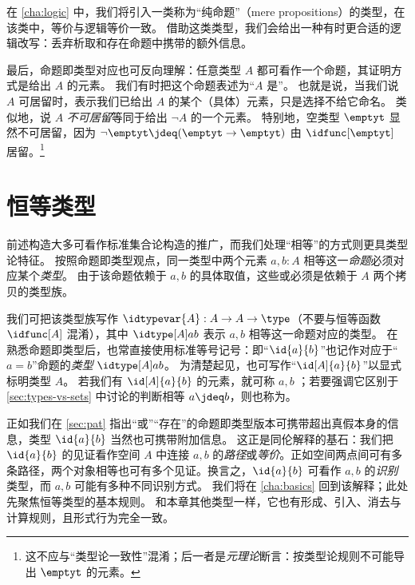 在 \cref{cha:logic} 中，我们将引入一类称为“纯命题”（mere propositions）的类型，在该类中，等价与逻辑等价一致。
借助这类类型，我们会给出一种有时更合适的逻辑改写：丢弃析取和存在命题中携带的额外信息。

最后，命题即类型对应也可反向理解：任意类型 $A$ 都可看作一个命题，其证明方式是给出 $A$ 的元素。
我们有时把这个命题表述为“$A$ 是”。
%
%
也就是说，当我们说 $A$ 可居留时，表示我们已给出 $A$ 的某个（具体）元素，只是选择不给它命名。
类似地，说 $A$ \emph{不可居留}等同于给出 $\neg A$ 的一个元素。
特别地，空类型 $\emptyt$ 显然不可居留，因为 $\neg \emptyt \jdeq (\emptyt \to \emptyt)$ 由 $\idfunc[\emptyt]$ 居留。\footnote{这不应与“类型论一致性”混淆；后一者是\emph{元理论}断言：按类型论规则不可能导出 $\emptyt$ 的元素。}

%
%
%

\section{恒等类型}
\label{sec:identity-types}

%
%
%
%
前述构造大多可看作标准集合论构造的推广，而我们处理“相等”的方式则更具类型论特征。
按照命题即类型观点，同一类型中两个元素 $a,b:A$ 相等这一\emph{命题}必须对应某个\emph{类型}。
由于该命题依赖于 $a,b$ 的具体取值，这些或必须是依赖于 $A$ 两个拷贝的类型族。

我们可把该类型族写作 $\idtypevar{A}:A\to A\to\type$（不要与恒等函数 $\idfunc[A]$ 混淆），其中 $\idtype[A]ab$ 表示 $a,b$ 相等这一命题对应的类型。
在熟悉命题即类型后，也常直接使用标准等号记号：即“$\id{a}{b}$”也记作对应于“$a=b$”命题的\emph{类型} $\idtype[A]ab$。
为清楚起见，也可写作“$\id[A]{a}{b}$”以显式标明类型 $A$。
若我们有 $\id[A]{a}{b}$ 的元素，就可称 $a,b$ ；若要强调它区别于 \cref{sec:types-vs-sets} 中讨论的判断相等 $a\jdeq b$，则也称为。
%
%

正如我们在 \cref{sec:pat} 指出“或”“存在”的命题即类型版本可携带超出真假本身的信息，类型 $\id{a}{b}$ 当然也可携带附加信息。
这正是同伦解释的基石：我们把 $\id{a}{b}$ 的见证看作空间 $A$ 中连接 $a,b$ 的\emph{路径}或\emph{等价}。正如空间两点间可有多条路径，两个对象相等也可有多个见证。换言之，$\id{a}{b}$ 可看作 $a,b$ 的\emph{识别}类型，而 $a,b$ 可能有多种不同识别方式。
我们将在 \cref{cha:basics} 回到该解释；此处先聚焦恒等类型的基本规则。
和本章其他类型一样，它也有形成、引入、消去与计算规则，且形式行为完全一致。

